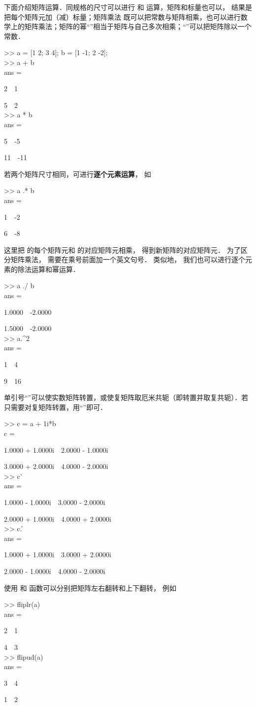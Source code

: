 下面介绍矩阵运算．同规格的尺寸可以进行 \x{+} 和 \x{-} 运算，矩阵和标量也可以， 结果是把每个矩阵元加（减）标量；矩阵乘法\x{*} 既可以把常数与矩阵相乘，也可以进行数学上的矩阵乘法；矩阵的幂“\x{\^{}}”相当于矩阵与自己多次相乘；“\x{/}”可以把矩阵除以一个常数．
\begin{Command}
>> a = [1 2; 3 4]; b = [1 -1; 2 -2]; \\
>> a + b \\
ans = \par
2\ \ 1 \par
5\ \ 2\\
>> a * b \\
ans = \par
5\ \ -5 \par
11\ \ -11
\end{Command}
若两个矩阵尺寸相同，可进行\textbf{逐个元素运算}， 如
\begin{Command}
>> a .* b \\
ans = \par
1\ \ -2 \par
6\ \ -8
\end{Command}
这里把  的每个矩阵元和  的对应矩阵元相乘， 得到新矩阵的对应矩阵元． 为了区分矩阵乘法， 需要在乘号前面加一个英文句号． 类似地， 我们也可以进行逐个元素的除法运算和幂运算．
\begin{Command}
>> a ./ b \\
ans = \par
1.0000\ \ -2.0000 \par
1.5000\ \ -2.0000\\
>> a.\^{}2 \\
ans = \par
1\ \ 4 \par
9\ \ 16
\end{Command}
单引号“”可以使实数矩阵转置，或使复矩阵取厄米共轭（即转置并取复共轭）．若只需要对复矩阵转置，用“”即可．
\begin{Command}
>> c = a + 1i*b \\
c = \par
1.0000 + 1.0000i\ \ 2.0000 - 1.0000i \par
3.0000 + 2.0000i\ \ 4.0000 - 2.0000i \\
>> c' \\
ans = \par
1.0000 - 1.0000i\ \ 3.0000 - 2.0000i \par
2.0000 + 1.0000i\ \ 4.0000 + 2.0000i \\
>> c.' \\
ans = \par
1.0000 + 1.0000i\ \ 3.0000 + 2.0000i \par
2.0000 - 1.0000i\ \ 4.0000 - 2.0000i
\end{Command}
使用  和  函数可以分别把矩阵左右翻转和上下翻转， 例如
\begin{Command}
>> fliplr(a)\\
ans = \par
2\ \ 1\par
4\ \ 3\\
>> flipud(a)\\
ans = \par
3\ \ 4\par
1\ \ 2
\end{Command}

